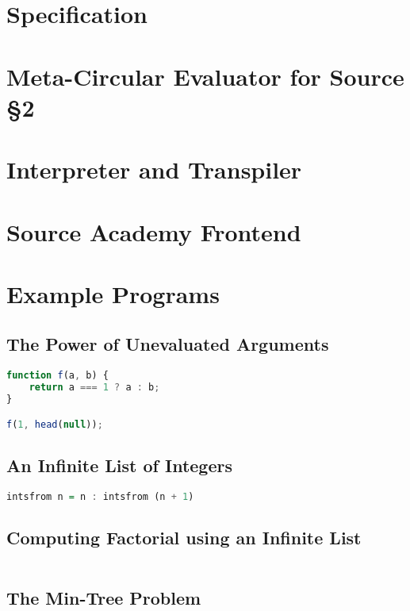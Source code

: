 \documentclass[12pt,a4paper]{report}
\begin{document}
\chapter{Specification}

\chapter{Meta-Circular Evaluator for Source \S2}

\chapter{Interpreter and Transpiler}

\chapter{Source Academy Frontend}

\chapter{Example Programs}
\section{The Power of Unevaluated Arguments}
\begin{lstlisting}[language=JavaScript]
function f(a, b) {
	return a === 1 ? a : b;
}

f(1, head(null));
\end{lstlisting}
\section{An Infinite List of Integers}
\begin{lstlisting}[language=haskell]
intsfrom n = n : intsfrom (n + 1)
\end{lstlisting}
\section{Computing Factorial using an Infinite List}
\begin{lstlisting}[language=haskell]
\end{lstlisting}
\section{The Min-Tree Problem}
\end{document}
